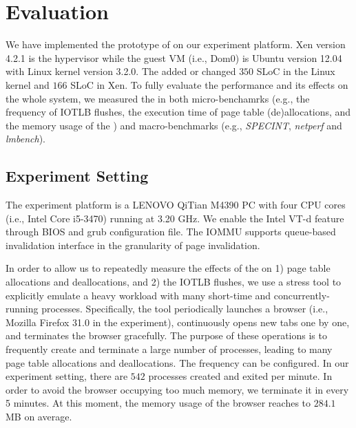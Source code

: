 \section{Evaluation} \label{sec:eva}
We have implemented the prototype of \name on our experiment platform.
Xen version 4.2.1 is the hypervisor while the guest VM (i.e., Dom0) is Ubuntu version 12.04 with Linux kernel version 3.2.0.
The \name added or changed $350$ SLoC in the Linux kernel and $166$ SLoC in Xen.
To fully evaluate the performance and its effects on the whole system, we measured the \name in both micro-benchamrks (e.g., the frequency of IOTLB flushes, the execution time of page table (de)allocations, and the memory usage of the \cache) and macro-benchmarks (e.g., \emph{SPECINT}, \emph{netperf} and \emph{lmbench}).

\subsection{Experiment Setting}
The experiment platform is a LENOVO QiTian M4390 PC with four CPU cores (i.e., Intel Core i5-3470) running at 3.20 GHz.
We enable the Intel VT-d feature through BIOS and grub configuration file. The IOMMU supports queue-based invalidation interface in the granularity of page invalidation.


In order to allow us to repeatedly measure the effects of the \name on 1) page table allocations and deallocations, and 2) the IOTLB flushes, we use a stress tool to explicitly emulate a heavy workload with many short-time and concurrently-running processes.
Specifically, the tool periodically launches a browser (i.e., Mozilla Firefox 31.0 in the experiment), continuously opens new tabs one by one, and terminates the browser gracefully.
The purpose of these operations is to frequently create and terminate a large number of processes, leading to many page table allocations and deallocations.
The frequency can be configured. In our experiment setting, there are $542$ processes created and exited per minute.
In order to avoid the browser occupying too much memory, we terminate it in every 5 minutes.
At this moment, the memory usage of the browser reaches to $284.1$ MB on average.

